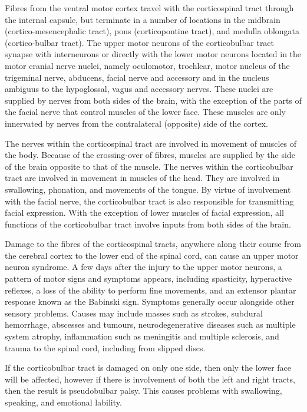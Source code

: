 \documentclass[]{book}
\begin{document}
Fibres from the ventral motor cortex travel with the corticospinal tract through the internal capsule, but terminate in a number of locations in the midbrain (cortico-mesencephalic tract), pons (corticopontine tract), and medulla oblongata (cortico-bulbar tract). The upper motor neurons of the corticobulbar tract synapse with interneurons or directly with the lower motor neurons located in the motor cranial nerve nuclei, namely oculomotor, trochlear, motor nucleus of the trigeminal nerve, abducens, facial nerve and accessory and in the nucleus ambiguus to the hypoglossal, vagus and accessory nerves. These nuclei are supplied by nerves from both sides of the brain, with the exception of the parts of the facial nerve that control muscles of the lower face. These muscles are only innervated by nerves from the contralateral (opposite) side of the cortex.

The nerves within the corticospinal tract are involved in movement of muscles of the body. Because of the crossing-over of fibres, muscles are supplied by the side of the brain opposite to that of the muscle. The nerves within the corticobulbar tract are involved in movement in muscles of the head. They are involved in swallowing, phonation, and movements of the tongue. By virtue of involvement with the facial nerve, the corticobulbar tract is also responsible for transmitting facial expression. With the exception of lower muscles of facial expression, all functions of the corticobulbar tract involve inputs from both sides of the brain.

Damage to the fibres of the corticospinal tracts, anywhere along their course from the cerebral cortex to the lower end of the spinal cord, can cause an upper motor neuron syndrome. A few days after the injury to the upper motor neurons, a pattern of motor signs and symptoms appears, including spasticity, hyperactive reflexes, a loss of the ability to perform fine movements, and an extensor plantar response known as the Babinski sign. Symptoms generally occur alongside other sensory problems. Causes may include masses such as strokes, subdural hemorrhage, abscesses and tumours, neurodegenerative diseases such as multiple system atrophy, inflammation such as meningitis and multiple sclerosis, and trauma to the spinal cord, including from slipped discs.

If the corticobulbar tract is damaged on only one side, then only the lower face will be affected, however if there is involvement of both the left and right tracts, then the result is pseudobulbar palsy. This causes problems with swallowing, speaking, and emotional lability.
\end{document}
